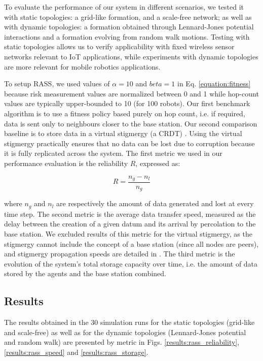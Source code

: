 To evaluate the performance of our system in different scenarios, we tested it with static topologies: a grid-like formation, and a scale-free network; as well as with dynamic topologies: a formation obtained through Lennard-Jones potential interactions and a formation evolving from random walk motions. Testing with static topologies allows us to verify applicability with fixed wireless sensor networks relevant to IoT applications, while experiments with dynamic topologies are more relevant for mobile robotics applications.

To setup \ac{RASS}, we used values of $\alpha = 10$ and $beta = 1$ in Eq. \ref{equation:fitness} because risk measurement values are normalized between 0 and 1 while hop-count values are typically upper-bounded to 10 (for 100 robots). Our first benchmark algorithm is to use a fitness policy based purely on hop count, i.e. if required, data is sent only to neighbours closer to the base station. Our second comparison baseline is to store data in a virtual stigmergy (a \ac{CRDT}) \cite{pinciroliTuple2016}. Using the virtual stigmergy practically ensures that no data can be lost due to corruption because it is fully replicated across the system. The first metric we used in our performance evaluation is the reliability $R$, expressed as:

\begin{equation}
    R = \frac{n_g - n_l}{n_g}
    \label{equation:reliability}
\end{equation}

where $n_g$ and $n_l$ are respectively the amount of data generated and lost at every time step. The second metric is the average data transfer speed, measured as the delay between the creation of a given datum and its arrival by percolation to the base station. We excluded results of this metric for the virtual stigmergy, as the stigmergy cannot include the concept of a base station (since all nodes are peers), and stigmergy propagation speeds are detailed in \cite{pinciroliTuple2016}. The third metric is the evolution of the system's total storage capacity over time, i.e. the amount of data stored by the agents and the base station combined.


\subsection{Results}

The results obtained in the 30 simulation runs for the static topologies (grid-like and scale-free) as well as for the dynamic topologies (Lennard-Jones potential and random walk) are presented by metric in Figs. \ref{results:rass_reliability}, \ref{results:rass_speed} and \ref{results:rass_storage}.

